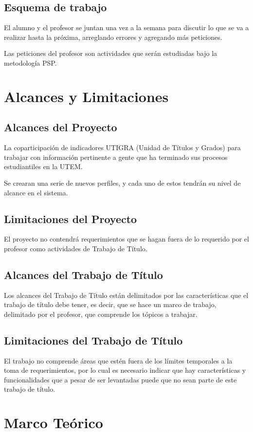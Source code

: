 \documentclass[a4paper,12pt,openany,oneside]{book}
\begin{document}
\section{Esquema de trabajo}
El alumno y el profesor se juntan una vez a la semana para discutir lo que se va a realizar hasta la próxima, arreglando errores y agregando más peticiones.

Las peticiones del profesor son actividades que serán estudiadas bajo la metodología PSP.
\chapter{Alcances y Limitaciones}
\thispagestyle{empty}
\section{Alcances del Proyecto}
La coparticipación de indicadores UTIGRA (Unidad de Títulos y Grados) para trabajar con información pertinente a gente que ha terminado sus procesos estudiantiles en la UTEM.

Se crearan una serie de nuevos perfiles, y cada uno de estos tendrán su nivel de alcance en el sistema.
\section{Limitaciones del Proyecto}
El proyecto no contendrá requerimientos que se hagan fuera de lo requerido por el profesor como actividades de Trabajo de Título.
\section{Alcances del Trabajo de Título}
Los alcances del Trabajo de Título están delimitados por las características que el trabajo de título debe tener, es decir, que se hace un marco de trabajo, delimitado por el profesor, que comprende los tópicos a trabajar.
\section{Limitaciones del Trabajo de Título}
El trabajo no comprende áreas que estén fuera de los límites temporales a la toma de requerimientos, por lo cual es necesario indicar que hay características y funcionalidades que a pesar de ser levantadas puede que no sean parte de este trabajo de título.
\chapter{Marco Teórico}
\thispagestyle{empty}
\end{document}
